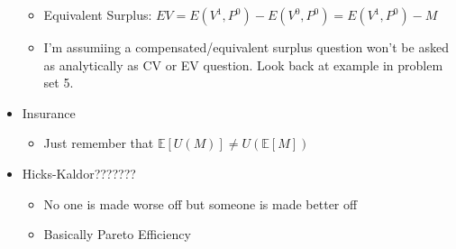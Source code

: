 \begin{itemize}
\begin{itemize}
		\item Equivalent Surplus: $EV = E(V^1,P^0) - E(V^0,P^0) = E(V^1,P^0) - M$
		\item I'm assumiing a compensated/equivalent surplus question won't be asked as analytically as CV or EV question. Look back at example in problem set 5.
	\end{itemize}
	\item Insurance
	\begin{itemize}
		\item Just remember that $\mathbb{E}[U(M)] \neq U(\mathbb{E}[M])$ 
	\end{itemize}
	\item Hicks-Kaldor???????
	\begin{itemize}
		\item No one is made worse off but someone is made better off
		\item Basically Pareto Efficiency
	\end{itemize}
\end{itemize}
